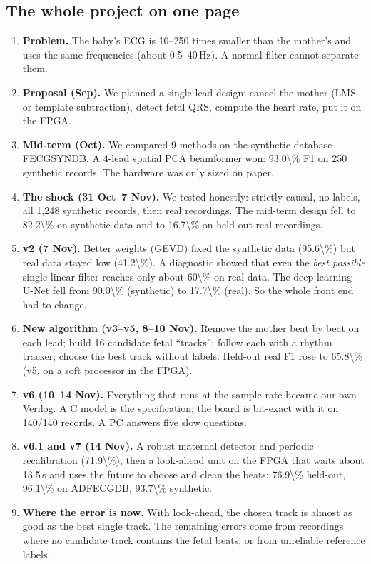 \documentclass[11pt]{article}
\begin{document}
\subsection{The whole project on one page}
\begin{enumerate}
  \item \textbf{Problem.} The baby's ECG is 10--250 times smaller than the mother's and uses the same frequencies (about 0.5--40\,Hz). A normal filter cannot separate them.
  \item \textbf{Proposal (Sep).} We planned a single-lead design: cancel the mother (LMS or template subtraction), detect fetal QRS, compute the heart rate, put it on the FPGA.
  \item \textbf{Mid-term (Oct).} We compared 9 methods on the synthetic database FECGSYNDB. A 4-lead spatial PCA beamformer won: \num{93.0\%} F1 on 250 synthetic records. The hardware was only sized on paper.
  \item \textbf{The shock (31 Oct--7 Nov).} We tested honestly: strictly causal, no labels, all 1,248 synthetic records, then real recordings. The mid-term design fell to \num{82.2\%} on synthetic data and to \num{16.7\%} on held-out real recordings.
  \item \textbf{v2 (7 Nov).} Better weights (GEVD) fixed the synthetic data (\num{95.6\%}) but real data stayed low (\num{41.2\%}). A diagnostic showed that even the \emph{best possible} single linear filter reaches only about \num{60\%} on real data. The deep-learning U-Net fell from \num{90.0\%} (synthetic) to \num{17.7\%} (real). So the whole front end had to change.
  \item \textbf{New algorithm (v3--v5, 8--10 Nov).} Remove the mother beat by beat on each lead; build 16 candidate fetal ``tracks''; follow each with a rhythm tracker; choose the best track without labels. Held-out real F1 rose to \num{65.8\%} (v5, on a soft processor in the FPGA).
  \item \textbf{v6 (10--14 Nov).} Everything that runs at the sample rate became our own Verilog. A C model is the specification; the board is bit-exact with it on 140/140 records. A PC answers five slow questions.
  \item \textbf{v6.1 and v7 (14 Nov).} A robust maternal detector and periodic recalibration (\num{71.9\%}), then a look-ahead unit on the FPGA that waits about 13.5\,s and uses the future to choose and clean the beats: \num{76.9\%} held-out, \num{96.1\%} on ADFECGDB, \num{93.7\%} synthetic.
  \item \textbf{Where the error is now.} With look-ahead, the chosen track is almost as good as the best single track. The remaining errors come from recordings where no candidate track contains the fetal beats, or from unreliable reference labels.
\end{enumerate}
\end{document}
